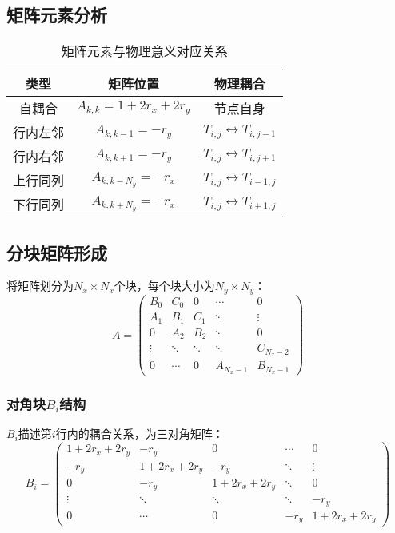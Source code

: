 \documentclass{ctexart}
\begin{document}
\subsection{矩阵元素分析}
\begin{table}[htbp]
\centering
\caption{矩阵元素与物理意义对应关系}
\begin{tabular}{c|c|c}
类型 & 矩阵位置 & 物理耦合 \\ \hline
自耦合 & $A_{k,k} = 1+2r_x+2r_y$ & 节点自身 \\
行内左邻 & $A_{k,k-1} = -r_y$ & $T_{i,j} \leftrightarrow T_{i,j-1}$ \\
行内右邻 & $A_{k,k+1} = -r_y$ & $T_{i,j} \leftrightarrow T_{i,j+1}$ \\
上行同列 & $A_{k,k-N_y} = -r_x$ & $T_{i,j} \leftrightarrow T_{i-1,j}$ \\
下行同列 & $A_{k,k+N_y} = -r_x$ & $T_{i,j} \leftrightarrow T_{i+1,j}$ \\
\end{tabular}
\end{table}

\subsection{分块矩阵形成}
将矩阵划分为$N_x \times N_x$个块，每个块大小为$N_y \times N_y$：
$$
A = \begin{pmatrix}
B_0 & C_0 & 0 & \cdots & 0 \\
A_1 & B_1 & C_1 & \ddots & \vdots \\
0 & A_2 & B_2 & \ddots & 0 \\
\vdots & \ddots & \ddots & \ddots & C_{N_x-2} \\
0 & \cdots & 0 & A_{N_x-1} & B_{N_x-1}
\end{pmatrix}
$$

\subsubsection{对角块$B_i$结构}
$B_i$描述第$i$行内的耦合关系，为三对角矩阵：
$$
B_i = \begin{pmatrix}
1+2r_x+2r_y & -r_y & 0 & \cdots & 0 \\
-r_y & 1+2r_x+2r_y & -r_y & \ddots & \vdots \\
0 & -r_y & 1+2r_x+2r_y & \ddots & 0 \\
\vdots & \ddots & \ddots & \ddots & -r_y \\
0 & \cdots & 0 & -r_y & 1+2r_x+2r_y
\end{pmatrix}
$$
\end{document}
